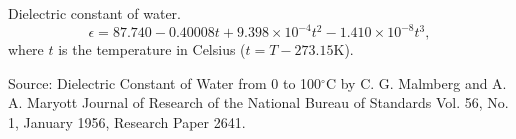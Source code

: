 \documentclass{article}
\begin{document}
Dielectric constant of water.
\begin{equation}
\epsilon
=
87.740 - 0.40008t + 9.398\times 10^{-4} t^2 - 1.410 \times 10^{-8} t^3,
\end{equation}
where $t$ is the temperature in Celsius ($t = T -273.15\mathrm{K}$).

Source:
Dielectric Constant of Water from 0 to 100$^\circ$C
by C. G. Malmberg and A. A. Maryott
Journal of Research of the National Bureau of Standards
Vol. 56, No. 1, January 1956, Research Paper 2641.
\end{document}

